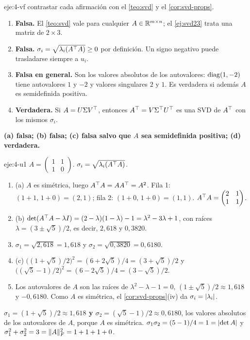 \begin{solucion}{eje:4-vf}
\planteamiento contrastar cada afirmación con el \cref{teo:svd} y el \cref{cor:svd-props}.
\pasos
\begin{enumerate}[label=(\alph*)]
  \item \textbf{Falsa.} El \cref{teo:svd} vale para cualquier $A\in\mathbb{R}^{m\times n}$; el \cref{ej:svd23} trata una matriz de $2\times 3$.
  \item \textbf{Falsa.} $\sigma_i=\sqrt{\lambda_i(A^{\top} A)}\ge 0$ por definición. Un signo negativo puede trasladarse siempre a $u_i$.
  \item \textbf{Falsa en general.} Son los valores absolutos de los autovalores: $\operatorname{diag}(1,-2)$ tiene autovalores $1$ y $-2$ y valores singulares $2$ y $1$. Es verdadera si además $A$ es semidefinida positiva.
  \item \textbf{Verdadera.} Si $A=U\Sigma V^{\top}$, entonces $A^{\top}=V\Sigma^{\top} U^{\top}$ es una SVD de $A^{\top}$ con los mismos $\sigma_i$.
\end{enumerate}
\resultado \textbf{(a) falsa; (b) falsa; (c) falsa salvo que $A$ sea semidefinida positiva; (d) verdadera.}
\end{solucion}

\begin{solucion}{eje:4-u1}
\datos $A=\begin{pmatrix}1&1\\1&0\end{pmatrix}$.
\planteamiento $\sigma_i=\sqrt{\lambda_i(A^{\top} A)}$.
\pasos
\begin{enumerate}[label=\arabic*.]
  \item (a) $A$ es simétrica, luego $A^{\top} A=AA^{\top}=A^{2}$. Fila 1: $(1+1,\,1+0)=(2,1)$; fila 2: $(1+0,\,1+0)=(1,1)$. $A^{\top} A=\begin{pmatrix}2&1\\1&1\end{pmatrix}$.
  \item (b) $\det(A^{\top} A-\lambda I)=(2-\lambda)(1-\lambda)-1=\lambda^{2}-3\lambda+1$, con raíces $\lambda=(3\pm\sqrt{5})/2$, es decir, $2{,}618$ y $0{,}3820$.
  \item $\sigma_1=\sqrt{2{,}618}=1{,}618$ y $\sigma_2=\sqrt{0{,}3820}=0{,}6180$.
  \item (c) $\bigl((1+\sqrt{5})/2\bigr)^{2}=(6+2\sqrt{5})/4=(3+\sqrt{5})/2$ y $\bigl((\sqrt{5}-1)/2\bigr)^{2}=(6-2\sqrt{5})/4=(3-\sqrt{5})/2$.
  \item Los autovalores de $A$ son las raíces de $\lambda^{2}-\lambda-1=0$, $(1\pm\sqrt{5})/2\approx 1{,}618$ y $-0{,}6180$. Como $A$ es simétrica, el \cref{cor:svd-props}(iv) da $\sigma_i=\lvert\lambda_i\rvert$.
\end{enumerate}
\resultado \textbf{$\sigma_1=(1+\sqrt{5})/2\approx 1{,}618$ y $\sigma_2=(\sqrt{5}-1)/2\approx 0{,}6180$}, los valores absolutos de los autovalores de $A$, porque $A$ es simétrica.
\comprobacion $\sigma_1\sigma_2=(5-1)/4=1=\lvert\det A\rvert$ y $\sigma_1^{2}+\sigma_2^{2}=3=\lVert A\rVert_F^{2}=1+1+1+0$.
\end{solucion}

